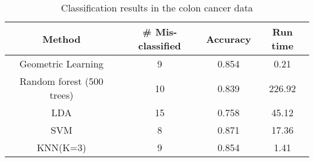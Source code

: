 \documentclass[twoside]{article}
\begin{document}
\begin{table*}[b]
\begin{center}
\begin{tabular} {| c | c  c  c|} \hline
Method & \# Mis-classified & Accuracy & Run time \\ \hline
Geometric Learning & 9 & 0.854 & 0.21 \\
Random forest (500 trees) & 10 & 0.839 & 226.92\\
LDA & 15 & 0.758 & 45.12\\
SVM & 8 & 0.871 & 17.36\\ 
KNN(K=3) & 9 & 0.854 & 1.41\\ \hline
\end{tabular}
\end{center}
\caption{Classification results in the colon cancer data}
\label{table:ColonTable}
\end{table*}

\newpage




\end{document}
